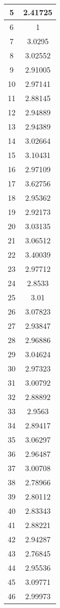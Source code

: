 \begin{table}[h]
\begin{subtable}[h]{2in}
{\begin{tabular}{|c|c|}
5	&	2.41725	\\	\hline
6	&	1	\\	\hline
7	&	3.0295	\\	\hline
8	&	3.02552	\\	\hline
9	&	2.91005	\\	\hline
10	&	2.97141	\\	\hline
11	&	2.88145	\\	\hline
12	&	2.94889	\\	\hline
13	&	2.94389	\\	\hline
14	&	3.02664	\\	\hline
15	&	3.10431	\\	\hline
16	&	2.97109	\\	\hline
17	&	3.62756	\\	\hline
18	&	2.95362	\\	\hline
19	&	2.92173	\\	\hline
20	&	3.03135	\\	\hline
21	&	3.06512	\\	\hline
22	&	3.40039	\\	\hline
23	&	2.97712	\\	\hline
24	&	2.8533	\\	\hline
25	&	3.01	\\	\hline
26	&	3.07823	\\	\hline
27	&	2.93847	\\	\hline
28	&	2.96886	\\	\hline
29	&	3.04624	\\	\hline
30	&	2.97323	\\	\hline
31	&	3.00792	\\	\hline
32	&	2.88892	\\	\hline
33	&	2.9563	\\	\hline
34	&	2.89417	\\	\hline
35	&	3.06297	\\	\hline
36	&	2.96487	\\	\hline
37	&	3.00708	\\	\hline
38	&	2.78966	\\	\hline
39	&	2.80112	\\	\hline
40	&	2.83343	\\	\hline
41	&	2.88221	\\	\hline
42	&	2.94287	\\	\hline
43	&	2.76845	\\	\hline
44	&	2.95536	\\	\hline
45	&	3.09771	\\	\hline
46	&	2.99973	\\	\hline

\end{tabular}}
\end{subtable}
\end{table}
